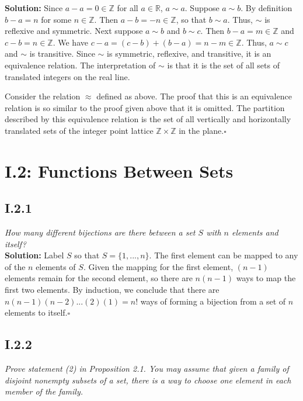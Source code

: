 \documentclass[11pt,a4paper]{article}
\begin{document}
\noindent\textbf{Solution:} Since $a - a = 0 \in \mathbb{Z}$ for all $a \in \mathbb{R}$, $a \sim a$.  Suppose $a \sim b$.  By definition $b - a = n$ for some $n \in \mathbb{Z}$.  Then $a - b = -n \in \mathbb{Z}$, so that $b \sim a$.  Thus, $\sim$ is reflexive and symmetric.  Next suppose $a \sim b$ and $b \sim c$.  Then $b - a = m \in \mathbb{Z}$ and $c - b = n \in \mathbb{Z}$.  We have $c - a = (c - b) + (b - a) = n - m \in \mathbb{Z}$.  Thus, $a \sim c$ and $\sim$ is transitive.  Since $\sim$ is symmetric, reflexive, and transitive, it is an equivalence relation.  The interpretation of $\sim$ is that it is the set of all sets of translated integers on the real line.

\noindent Consider the relation $\approx$ defined as above.  The proof that this is an equivalence relation is so similar to the proof given above that it is omitted.  The partition described by this equivalence relation is the set of all vertically and horizontally translated sets of the integer point lattice $\mathbb{Z} \times \mathbb{Z}$ in the plane.$\square$

\newpage

\section*{I.2: Functions Between Sets}

\subsection*{I.2.1} \textit{How many different bijections are there between a set $S$ with $n$ elements and itself?} \\

\noindent \textbf{Solution:}  Label $S$ so that $S = \{1,...,n\}$.  The first element can be mapped to any of the $n$ elements of $S$.  Given the mapping for the first element, $(n-1)$ elements remain for the second element, so there are $n(n-1)$ ways to map the first two elements.  By induction, we conclude that there are $n(n-1)(n-2)...(2)(1) = n!$ ways of forming a bijection from a set of $n$ elements to itself.$\square$

\subsection*{I.2.2} \textit{Prove statement (2) in Proposition 2.1. You may assume that given a family of disjoint nonempty subsets of a set, there is a way to choose one element in each member of the family.}\\
\end{document}
